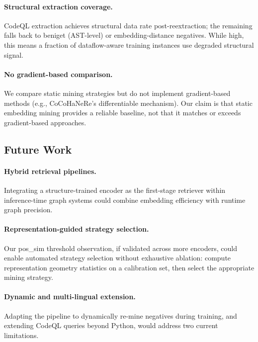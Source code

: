 \paragraph{Structural extraction coverage.}
CodeQL extraction achieves  structural data rate post-reextraction; the remaining  falls back to beniget (AST-level) or embedding-distance negatives.
While high, this means a fraction of dataflow-aware training instances use degraded structural signal.

\paragraph{No gradient-based comparison.}
We compare static mining strategies but do not implement gradient-based methods (e.g., CoCoHaNeRe's differentiable mechanism).
Our claim is that static embedding mining provides a reliable baseline, not that it matches or exceeds gradient-based approaches.

\subsection{Future Work}
\label{sec:future}

\paragraph{Hybrid retrieval pipelines.}
Integrating a structure-trained encoder as the first-stage retriever within inference-time graph systems could combine embedding efficiency with runtime graph precision.

\paragraph{Representation-guided strategy selection.}
Our pos\_sim threshold observation, if validated across more encoders, could enable automated strategy selection without exhaustive ablation: compute representation geometry statistics on a calibration set, then select the appropriate mining strategy.

\paragraph{Dynamic and multi-lingual extension.}
Adapting the pipeline to dynamically re-mine negatives during training, and extending CodeQL queries beyond Python, would address two current limitations.


